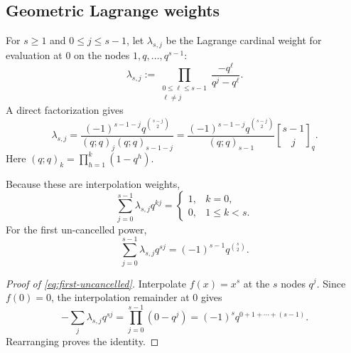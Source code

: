 \documentclass[11pt]{article}
\numberwithin{equation}{section}
\theoremstyle{definition}
\theoremstyle{remark}
\newcommand{\qbinom}[3]{\genfrac{[}{]}{0pt}{}{#1}{#2}_{#3}}
\begin{document}
\subsection{Geometric Lagrange weights}

For $s\ge1$ and $0\le j\le s-1$, let $\lambda_{s,j}$ be the Lagrange cardinal weight for evaluation at $0$ on the nodes $1,q,\ldots,q^{s-1}$:
\begin{equation}
 \lambda_{s,j}:=\prod_{\substack{0\le\ell\le s-1\\\ell\ne j}}
 \frac{-q^\ell}{q^j-q^\ell}.
 \label{eq:lambda-Lagrange}
\end{equation}
A direct factorization gives
\begin{equation}
 \boxed{
 \lambda_{s,j}
 =\frac{(-1)^{s-1-j}q^{\binom{s-j}{2}}}
 {(q;q)_j(q;q)_{s-1-j}}
 =\frac{(-1)^{s-1-j}q^{\binom{s-j}{2}}}{(q;q)_{s-1}}
 \qbinom{s-1}{j}{q}.}
 \label{eq:lambda-qbinomial}
\end{equation}
Here
\((q;q)_k=\prod_{h=1}^{k}(1-q^h)\).

Because these are interpolation weights,
\begin{equation}
 \sum_{j=0}^{s-1}\lambda_{s,j}q^{kj}
 =\begin{cases}
 1,&k=0,\\
 0,&1\le k<s.
 \end{cases}
 \label{eq:lambda-cancellation}
\end{equation}
For the first un-cancelled power,
\begin{equation}
 \sum_{j=0}^{s-1}\lambda_{s,j}q^{sj}
 =(-1)^{s-1}q^{\binom s2}.
 \label{eq:first-uncancelled}
\end{equation}

\begin{proof}[Proof of \eqref{eq:first-uncancelled}]
Interpolate $f(x)=x^s$ at the $s$ nodes $q^j$.  Since $f(0)=0$, the interpolation remainder at $0$ gives
\[
 -\sum_j\lambda_{s,j}q^{sj}
 =\prod_{j=0}^{s-1}(0-q^j)
 =(-1)^sq^{0+1+\cdots+(s-1)}.
\]
Rearranging proves the identity.
\end{proof}
\end{document}
